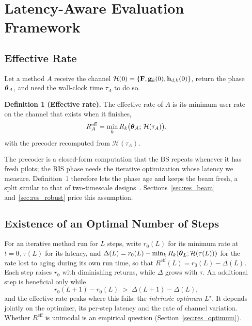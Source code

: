 \section{Latency-Aware Evaluation Framework}
\label{sec:framework}

\subsection{Effective Rate}
Let a method $A$ receive the channel $\mathcal{H}(0)=\{\mathbf{F},\mathbf{g}_k(0),\mathbf{h}_{d,k}(0)\}$, return the phase $\boldsymbol{\theta}_A$, and need the wall-clock time $\tau_A$ to do so.

\textbf{Definition 1 (Effective rate).} The effective rate of $A$ is its minimum user rate on the channel that exists when it finishes,
\begin{equation}
    R^{\mathrm{eff}}_A = \min_k R_k\big(\boldsymbol{\theta}_A;\,\mathcal{H}(\tau_A)\big),
    \label{eq:effective_rate}
\end{equation}
with the precoder recomputed from $\mathcal{H}(\tau_A)$.

The precoder is a closed-form computation that the BS repeats whenever it has fresh pilots; the RIS phase needs the iterative optimization whose latency we measure. Definition~1 therefore lets the phase age and keeps the beam fresh, a split similar to that of two-timescale designs~\cite{Zhao2021TWC}. Sections~\ref{sec:res_beam} and~\ref{sec:res_robust} price this assumption.

\subsection{Existence of an Optimal Number of Steps}
For an iterative method run for $L$ steps, write $r_0(L)$ for its minimum rate at $t=0$, $\tau(L)$ for its latency, and $\Delta(L)=r_0(L)-\min_k R_k(\boldsymbol{\theta}_L;\mathcal{H}(\tau(L)))$ for the rate lost to aging during its own run time, so that $R^{\mathrm{eff}}(L)=r_0(L)-\Delta(L)$. Each step raises $r_0$ with diminishing returns, while $\Delta$ grows with $\tau$. An additional step is beneficial only while
\begin{equation}
    r_0(L+1)-r_0(L) \;>\; \Delta(L+1)-\Delta(L),
    \label{eq:marginal}
\end{equation}
and the effective rate peaks where this fails: the \emph{intrinsic optimum} $L^\star$. It depends jointly on the optimizer, its per-step latency and the rate of channel variation. Whether $R^{\mathrm{eff}}$ is unimodal is an empirical question (Section~\ref{sec:res_optimum}).

